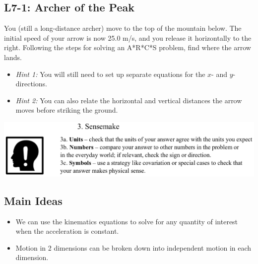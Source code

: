 \documentclass[]{article}
\begin{document}
\begin{PresentSpace}
	\vspace{-10pt}
	\section*{L7-1: Archer of the Peak}
	\vspace{-10pt}
	You (still a long-distance archer) move to the top of the mountain below. The initial speed of your arrow is now 25.0 m/s, and you release it horizontally to the right. Following the steps for solving an A*R*C*S problem, find where the arrow lands.
	\begin{itemize}
		\item \textit{Hint 1:} You will still need to set up separate equations for the $x$- and $y$-directions.
		\item \textit{Hint 2:} You can also relate the horizontal and vertical distances the arrow moves before striking the ground.
	\end{itemize}
	\begin{center}
	\end{center}
	\begin{center}
		\includegraphics[scale=0.4]{Sensemake}
	\end{center}
\end{PresentSpace}
\newpage
\begin{TeacherMargin}
	
\end{TeacherMargin}
\begin{PresentSpace}
	\section*{Main Ideas}
	\begin{itemize}
		\item We can use the kinematics equations to solve for any quantity of interest when the acceleration is constant.
		\item Motion in 2 dimensions can be broken down into independent motion in each dimension.
	\end{itemize}
\end{PresentSpace}
\end{document}
